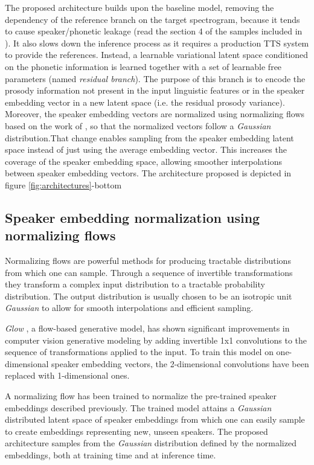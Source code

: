 The proposed architecture builds upon the baseline model, removing the dependency of the reference branch on the target spectrogram, because it tends to cause speaker/phonetic leakage (read the section 4 of the samples included in \autocite{skerryryan2018}). It also slows down the inference process as it requires a production TTS system to provide the references. Instead, a learnable variational latent space conditioned on the phonetic information is learned together with a set of learnable free parameters (named \textit{residual branch}). The purpose of this branch is to encode the prosody information not present in the input linguistic features or in the speaker embedding vector in a new latent space (i.e. the residual prosody variance). Moreover, the speaker embedding vectors are normalized using normalizing flows based on the work of \autocite{kingma2018}, so that the normalized vectors follow a \textit{Gaussian} distribution.That change enables sampling from the speaker embedding latent space instead of just using the average embedding vector. This increases the coverage of the speaker embedding space, allowing smoother interpolations between speaker embedding vectors. The architecture proposed is depicted in figure \ref{fig:architectures}-bottom




\subsection{Speaker embedding normalization using normalizing flows}
Normalizing flows \autocite{rezende2015} are powerful methods for producing tractable distributions from which one can sample. Through a sequence of invertible transformations they transform a complex input distribution to a tractable probability distribution. The output distribution is usually chosen to be an isotropic unit \textit{Gaussian} to allow for smooth interpolations and efficient sampling.

\textit{Glow} \autocite{kingma2018}, a flow-based generative model, has shown significant improvements in computer vision generative modeling by adding invertible 1x1 convolutions to the sequence of transformations applied to the input. To train this model on one-dimensional speaker embedding vectors, the 2-dimensional convolutions have been replaced with 1-dimensional ones.

A normalizing flow has been trained to normalize the pre-trained speaker embeddings described previously. The trained model attains a \textit{Gaussian} distributed latent space of speaker embeddings from which one can easily sample to create embeddings representing new, unseen speakers. The proposed architecture samples from the \textit{Gaussian} distribution defined by the normalized embeddings, both at training time and at inference time.


